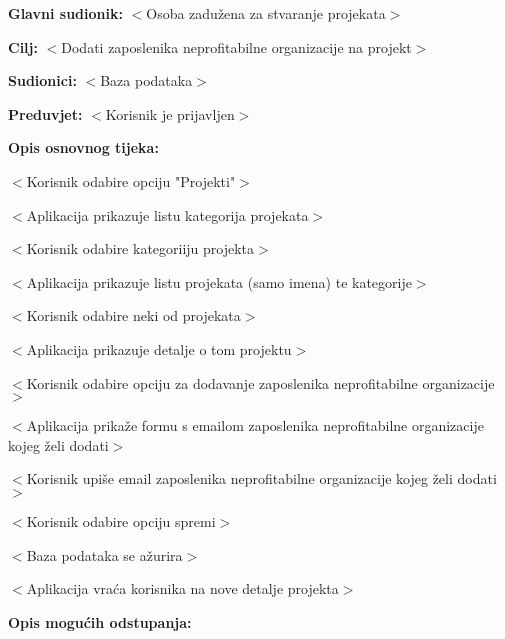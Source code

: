 					\noindent {}
					\begin{packed_item}

						\item \textbf{Glavni sudionik: }$<$Osoba zadužena za stvaranje projekata$>$
						\item  \textbf{Cilj:} $<$Dodati zaposlenika neprofitabilne organizacije na projekt$>$
						\item  \textbf{Sudionici:} $<$Baza podataka$>$
						\item  \textbf{Preduvjet:} $<$Korisnik je prijavljen$>$
						\item  \textbf{Opis osnovnog tijeka:}

						\item[] \begin{packed_enum}

							\item $<$Korisnik odabire opciju "Projekti"$>$
							\item $<$Aplikacija prikazuje listu kategorija projekata$>$
							\item $<$Korisnik odabire kategoriiju projekta$>$
							\item $<$Aplikacija prikazuje listu projekata (samo imena) te kategorije$>$
							\item $<$Korisnik odabire neki od projekata$>$
							\item $<$Aplikacija prikazuje detalje o tom projektu$>$
							\item $<$Korisnik odabire opciju za dodavanje zaposlenika neprofitabilne organizacije$>$
							\item $<$Aplikacija prikaže formu s emailom zaposlenika neprofitabilne organizacije kojeg želi dodati$>$
							\item $<$Korisnik upiše email zaposlenika neprofitabilne organizacije kojeg želi dodati$>$
							\item $<$Korisnik odabire opciju spremi$>$
							\item $<$Baza podataka se ažurira$>$
							\item $<$Aplikacija vraća korisnika na nove detalje projekta$>$
						\end{packed_enum}

						\item  \textbf{Opis mogućih odstupanja:}

						\item[] \begin{packed_item}


\end{packed_item}
\end{packed_item}
